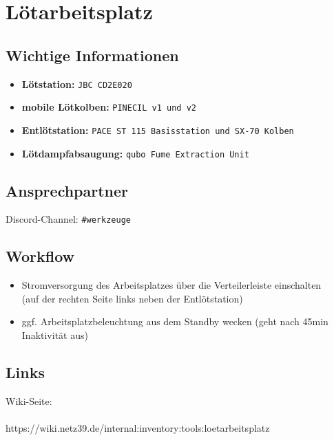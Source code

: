 \documentclass[a5paper]{article}
\begin{document}
	
	\noindent
	\begin{minipage}{0.25\textwidth}
		\section*{Lötarbeitsplatz}
	\end{minipage}
	\hfill	
	\begin{minipage}{0.1\textwidth}
				
	\end{minipage}%
	
	\subsection*{Wichtige Informationen}
	\begin{itemize}
		\item \textbf{Lötstation:} \texttt{JBC CD2E020}
		\item \textbf{mobile Lötkolben:} \texttt{PINECIL v1 und v2}
		\item \textbf{Entlötstation:} \texttt{PACE ST 115 Basisstation und SX-70 Kolben}
		\item \textbf{Lötdampfabsaugung:} \texttt{qubo Fume Extraction Unit}
	\end{itemize}
	
	\noindent\dotfill
	\subsection*{Ansprechpartner}
	Discord-Channel: \colorbox{gray!30}{\texttt{\#werkzeuge}}
	\vspace{1em}\\
	
	\noindent\dotfill
	\subsection*{Workflow}
	\begin{itemize}
	    \item Stromversorgung des Arbeitsplatzes über die Verteilerleiste einschalten\\ (auf der rechten Seite links neben der Entlötstation)
	    \item ggf. Arbeitsplatzbeleuchtung aus dem Standby wecken (geht nach 45min Inaktivität aus)
	\end{itemize}
	
		
	\noindent\dotfill
	\subsection*{Links}
	\begin{center}
		\begin{minipage}{0.6\textwidth}
			\centering
			Wiki-Seite:\\[0.5em]
			\\[0.5em]
			https://wiki.netz39.de/internal:inventory:tools:loetarbeitsplatz
		\end{minipage}
	\end{center}
	
\end{document}
